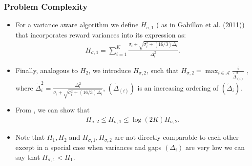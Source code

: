 \begin{frame}
\frametitle{Problem Complexity}
\begin{itemize}
\item<1-> For a variance aware algorithm we define $H_{\sigma , 1}$ ( as in {Gabillon et al. (2011)}) that incorporates reward variances into its expression as:
\begin{align*}
 H_{\sigma,1}=\sum_{i=1}^{K}\frac{\sigma_{i}+\sqrt{\sigma_{i}^{2}+(16/3)\Delta_{i}}}{\Delta_{i}^{2}}.
\end{align*}

\item<2-> Finally, analogous to $H_{2}$, we introduce $H_{\sigma,2}$, such that $
H_{\sigma,2}=\max_{i\in \mathcal{A}} \frac{i}{\tilde{\Delta}_{(i)}^{2}}$ , where $\tilde{\Delta}_{i}^{2}=\frac{\Delta_{i}^{2}}{\sigma_{i}+\sqrt{\sigma_{i}^{2}+(16/3)\Delta_{i}}}$,  $(\tilde{\Delta}_{(i)})$ is an increasing ordering of $(\tilde{\Delta}_{i})$.

\item<3-> From \cite{audibert2010best}, we can show that
\begin{align*}
H_{\sigma,2}\le H_{\sigma,1} \le \log(2K) H_{\sigma,2}.
\end{align*}


\item<4-> Note that $H_1 , H_2 $ and $H_{\sigma,1}, H_{\sigma,2}$ are not directly comparable to each other except in a special case when variances and gaps $(\Delta_i)$ are very low we can say that $H_{\sigma,1} < H_{1} $.

\end{itemize}
\end{frame}



